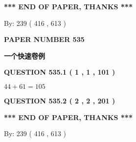 \documentclass{ctexart}
\begin{document}
   
 \vspace{0.2in}
 
   
   
   
   
\vspace{1.0in} 
{\textbf{\large{ *** END OF PAPER, THANKS *** }}} 
   
   
\hspace{1.0in} By: 
 239 ( 416 ,  613 )
   
   
   
   
\newpage 
\setcounter{page}{ 
   535001 } 
   
   
   
   
 {\textbf{ \Large{ PAPER NUMBER  535  }}}
   
   
\vspace{0.2in}
   
   
   
   
   
   
 \vspace{0.2in}
{\LARGE {\textbf{ 一个快速卷例}}}
   
   
  
\vspace{0.2in}
  
{\textbf{\Large{QUESTION
535.1 
 ( 1 , 1 , 101 )
}}}
  
  
 
 

$ %
44 +  %
61=   %
105$
 
 
  
\vspace{0.2in}
  
{\textbf{\Large{QUESTION
535.2 
 ( 2 , 2 , 201 )
}}}
  
  
   
   
 \vspace{0.2in}
 
   
   
   
   
\vspace{1.0in} 
{\textbf{\large{ *** END OF PAPER, THANKS *** }}} 
   
   
\hspace{1.0in} By: 
 239 ( 416 ,  613 )
   
   
   
   
\newpage 
\setcounter{page}{ 
   536001 } 
   
   
   
\end{document}
